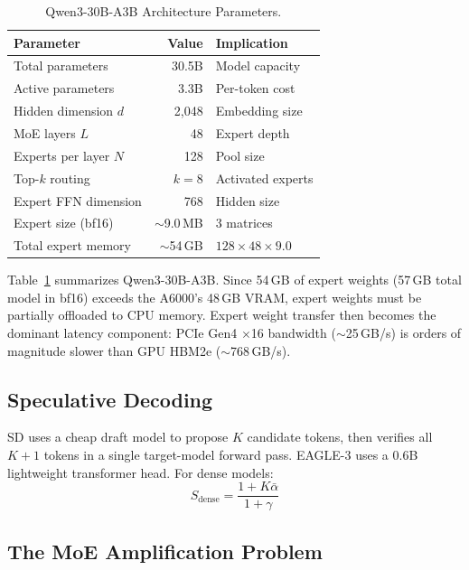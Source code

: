 \documentclass[letterpaper,twocolumn,10pt]{article}
\newcommand{\thetabar}{\bar{\alpha}}
\begin{document}
\begin{table}[t]
\centering
\small
\caption{Qwen3-30B-A3B Architecture Parameters.}\label{tab:model}
\begin{tabular}{lrl}
\toprule
\textbf{Parameter} & \textbf{Value} & \textbf{Implication} \\
\midrule
Total parameters         & 30.5B  & Model capacity \\
Active parameters        & 3.3B   & Per-token cost \\
Hidden dimension $d$     & 2{,}048 & Embedding size \\
MoE layers $L$           & 48     & Expert depth \\
Experts per layer $N$    & 128    & Pool size \\
Top-$k$ routing          & $k\!=\!8$ & Activated experts \\
Expert FFN dimension     & 768    & Hidden size \\
Expert size (bf16)       & ${\sim}$9.0\,MB & 3 matrices \\
Total expert memory      & ${\sim}$54\,GB & $128\!\times\!48\!\times\!9.0$ \\
\bottomrule
\end{tabular}
\end{table}

Table~\ref{tab:model} summarizes Qwen3-30B-A3B.  Since 54\,GB of
expert weights (57\,GB total model in bf16) exceeds
the A6000's 48\,GB VRAM, expert weights must be partially offloaded to CPU
memory.  Expert weight transfer then becomes the dominant latency
component: PCIe Gen4 $\times$16 bandwidth (${\sim}$25\,GB/s) is orders of
magnitude slower than GPU HBM2e (${\sim}$768\,GB/s).

\subsection{Speculative Decoding}\label{sec:sd}

SD uses a cheap draft model to propose $K$ candidate tokens, then verifies
all $K\!+\!1$ tokens in a single target-model forward pass.  EAGLE-3
\cite{li2025eagle3} uses a 0.6B lightweight transformer head.  For dense
models:
\begin{equation}\label{eq:dense-speedup}
  S_{\text{dense}} = \frac{1 + K\thetabar}{1+\gamma}
\end{equation}

\subsection{The MoE Amplification Problem}\label{sec:maf}
\end{document}
